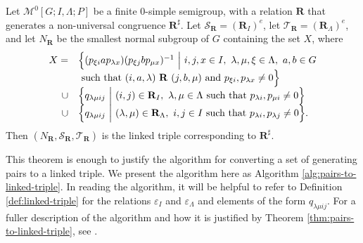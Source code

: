 \begin{theorem}
  \label{thm:pairs-to-linked-triple}
  Let $\mathcal{M}^0[G;I,\Lambda;P]$ be a finite 0-simple semigroup, with a
  relation $\mathbf{R}$ that generates a non-universal congruence
  $\mathbf{R}^\sharp$.  Let $\mathcal{S}_\mathbf{R} = (\mathbf{R}_I)^e$, let
  $\mathcal{T}_\mathbf{R} = (\mathbf{R}_\Lambda)^e$, and let $N_\mathbf{R}$ be the smallest normal
  subgroup of $G$ containing the set $X$, where
  $$\begin{array}{r l}
  X = & \Big\{(p_{\xi i} a p_{\lambda x}) (p_{\xi j} b p_{\mu x})^{-1}
        ~\Big|~ i,j,x \in I,\ \lambda, \mu, \xi \in \Lambda,\ a,b \in G \\
      & \text{~such that~} (i,a,\lambda) ~\mathbf{R}~ (j,b,\mu) \text{~and~}
        p_{\xi i}, p_{\lambda x} \neq 0\Big\} \\
  \cup & \Big\{q_{\lambda \mu i j} ~\Big|~
  (i,j) \in \mathbf{R}_I,~
  \lambda,\mu \in \Lambda ~\textnormal{such that}~
  p_{\lambda i}, p_{\mu i} \neq 0\Big\} \\
  \cup & \Big\{q_{\lambda \mu i j} ~\Big|~
  (\lambda,\mu) \in \mathbf{R}_\Lambda,~
  i,j \in I ~\textnormal{such that}~
  p_{\lambda i}, p_{\lambda j} \neq 0\Big\}. \\
  \end{array}$$
  Then $(N_\mathbf{R}, \mathcal{S}_\mathbf{R}, \mathcal{T}_\mathbf{R})$
  is the linked triple corresponding to $\mathbf{R}^\sharp$.
\end{theorem}

This theorem is enough to justify the algorithm for converting a set of
generating pairs to a linked triple.  We present the algorithm here as Algorithm
\ref{alg:pairs-to-linked-triple}.  In reading the algorithm, it will be helpful
to refer to Definition \ref{def:linked-triple} for the relations $\varepsilon_I$
and $\varepsilon_\Lambda$ and elements of the form $q_{\lambda \mu i j}$.
For a fuller description of the algorithm and how it is justified by Theorem
\ref{thm:pairs-to-linked-triple}, see \cite[\S 3.2]{mtorpey_msc}.


